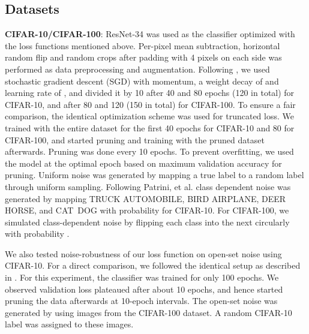 \documentclass{article}
\begin{document}
\subsection{Datasets}
\textbf{CIFAR-10/CIFAR-100}:
ResNet-34 was used as the classifier optimized with the loss functions mentioned above. Per-pixel mean subtraction, horizontal random flip and  random crops after padding with 4 pixels on each side was performed as data preprocessing and augmentation. Following \cite{huang2016deep}, we used stochastic gradient descent (SGD) with  momentum, a weight decay of  and learning rate of , and divided it by 10 after 40 and 80 epochs (120 in total) for CIFAR-10, and after 80 and 120 (150 in total) for CIFAR-100. To ensure a fair comparison, the identical optimization scheme was used for truncated  loss. We trained with the entire dataset for the first 40 epochs for CIFAR-10 and 80 for CIFAR-100, and started pruning and training with the pruned dataset afterwards. Pruning was done every 10 epochs. To prevent overfitting, we used the model at the optimal epoch based on maximum validation accuracy for pruning. Uniform noise was generated by mapping a true label to a random label through uniform sampling. Following Patrini, et al. \cite{patrini2017making} class dependent noise was generated by mapping TRUCK  AUTOMOBILE, BIRD  AIRPLANE, DEER  HORSE, and CAT\  DOG with probability  for CIFAR-10. For CIFAR-100, we simulated class-dependent noise by flipping each class into the next circularly with probability .

We also tested noise-robustness of our loss function on open-set noise using CIFAR-10. For a direct comparison, we followed the identical setup as described in \cite{wang2018iterative}. For this experiment, the classifier was trained for only 100 epochs. We observed validation loss plateaued after about 10 epochs, and hence started pruning the data afterwards at 10-epoch intervals. The open-set noise was generated by using images from the CIFAR-100 dataset. A random CIFAR-10 label was assigned to these images. 
\end{document}
